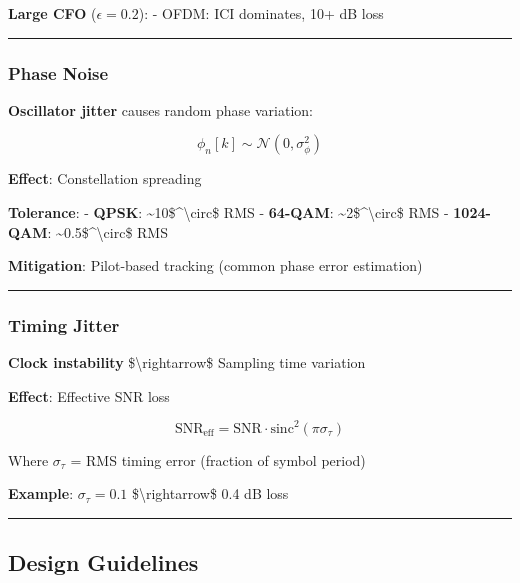 \textbf{Large CFO} (\(\epsilon = 0.2\)): - OFDM: ICI dominates, 10+ dB
loss

\begin{center}\rule{0.5\linewidth}{0.5pt}\end{center}

\subsubsection{Phase Noise}\label{phase-noise}

\textbf{Oscillator jitter} causes random phase variation:

\[
\phi_n[k] \sim \mathcal{N}(0, \sigma_\phi^2)
\]

\textbf{Effect}: Constellation spreading

\textbf{Tolerance}: - \textbf{QPSK}:
\textasciitilde10\$\^{}\textbackslash circ\$ RMS - \textbf{64-QAM}:
\textasciitilde2\$\^{}\textbackslash circ\$ RMS - \textbf{1024-QAM}:
\textasciitilde0.5\$\^{}\textbackslash circ\$ RMS

\textbf{Mitigation}: Pilot-based tracking (common phase error
estimation)

\begin{center}\rule{0.5\linewidth}{0.5pt}\end{center}

\subsubsection{Timing Jitter}\label{timing-jitter}

\textbf{Clock instability} \$\textbackslash rightarrow\$ Sampling time
variation

\textbf{Effect}: Effective SNR loss

\[
\text{SNR}_{\text{eff}} = \text{SNR} \cdot \text{sinc}^2(\pi \sigma_\tau)
\]

Where \(\sigma_\tau\) = RMS timing error (fraction of symbol period)

\textbf{Example}: \(\sigma_\tau = 0.1\) \$\textbackslash rightarrow\$
0.4 dB loss

\begin{center}\rule{0.5\linewidth}{0.5pt}\end{center}

\subsection{Design Guidelines}\label{design-guidelines}

